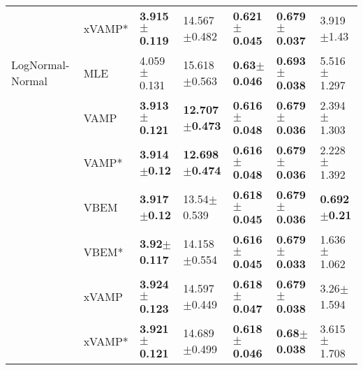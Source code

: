 \begin{tabular}{lllllll}
                 & xVAMP* &  \textbf{3.915$\pm$0.119} &           14.567$\pm$0.482 &  \textbf{0.621$\pm$0.045} &  \textbf{0.679$\pm$0.037} &            3.919$\pm$1.43 \\
LogNormal-Normal & MLE &           4.059$\pm$0.131 &           15.618$\pm$0.563 &   \textbf{0.63$\pm$0.046} &  \textbf{0.693$\pm$0.038} &           5.516$\pm$1.297 \\
                 & VAMP &  \textbf{3.913$\pm$0.121} &  \textbf{12.707$\pm$0.473} &  \textbf{0.616$\pm$0.048} &  \textbf{0.679$\pm$0.036} &           2.394$\pm$1.303 \\
                 & VAMP* &   \textbf{3.914$\pm$0.12} &  \textbf{12.698$\pm$0.474} &  \textbf{0.616$\pm$0.048} &  \textbf{0.679$\pm$0.036} &           2.228$\pm$1.392 \\
                 & VBEM &   \textbf{3.917$\pm$0.12} &            13.54$\pm$0.539 &  \textbf{0.618$\pm$0.045} &  \textbf{0.679$\pm$0.036} &   \textbf{0.692$\pm$0.21} \\
                 & VBEM* &   \textbf{3.92$\pm$0.117} &           14.158$\pm$0.554 &  \textbf{0.616$\pm$0.045} &  \textbf{0.679$\pm$0.033} &           1.636$\pm$1.062 \\
                 & xVAMP &  \textbf{3.924$\pm$0.123} &           14.597$\pm$0.449 &  \textbf{0.618$\pm$0.047} &  \textbf{0.679$\pm$0.038} &            3.26$\pm$1.594 \\
                 & xVAMP* &  \textbf{3.921$\pm$0.121} &           14.689$\pm$0.499 &  \textbf{0.618$\pm$0.046} &   \textbf{0.68$\pm$0.038} &           3.615$\pm$1.708 \\
\bottomrule
\end{tabular}

